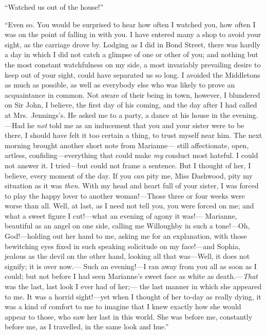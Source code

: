 \documentclass{article}
\begin{document}
``Watched us out of the house!''

``Even so.  You would be surprised to hear how often
I watched you, how often I was on the point of falling
in with you.  I have entered many a shop to avoid your sight,
as the carriage drove by.  Lodging as I did in Bond Street,
there was hardly a day in which I did not catch a glimpse
of one or other of you; and nothing but the most constant
watchfulness on my side, a most invariably prevailing
desire to keep out of your sight, could have separated us
so long.  I avoided the Middletons as much as possible,
as well as everybody else who was likely to prove
an acquaintance in common.  Not aware of their being
in town, however, I blundered on Sir John, I believe,
the first day of his coming, and the day after I had called
at Mrs.\ Jennings's.  He asked me to a party, a dance at his
house in the evening.---Had he \emph{not} told me as an inducement
that you and your sister were to be there, I should have
felt it too certain a thing, to trust myself near him.
The next morning brought another short note from Marianne---%
still affectionate, open, artless, confiding---everything
that could make \emph{my} conduct most hateful.  I could not
answer it.  I tried---but could not frame a sentence.
But I thought of her, I believe, every moment of the day.
If you \emph{can} pity me, Miss Dashwood, pity my situation as it
was \emph{then}.  With my head and heart full of your sister,
I was forced to play the happy lover to another woman!---Those
three or four weeks were worse than all.  Well, at last,
as I need not tell you, you were forced on me; and what a
sweet figure I cut!---what an evening of agony it was!---%
Marianne, beautiful as an angel on one side, calling me
Willoughby in such a tone!---Oh, God!---holding out her hand
to me, asking me for an explanation, with those bewitching
eyes fixed in such speaking solicitude on my face!---and
Sophia, jealous as the devil on the other hand, looking
all that was---Well, it does not signify; it is over now.---%
Such an evening!---I ran away from you all as soon as I could;
but not before I had seen Marianne's sweet face as white
as death.---\emph{That} was the last, last look I ever had of her;---%
the last manner in which she appeared to me.  It was a horrid
sight!---yet when I thought of her to-day as really dying,
it was a kind of comfort to me to imagine that I knew
exactly how she would appear to those, who saw her last
in this world.  She was before me, constantly before me,
as I travelled, in the same look and hue.''
\end{document}
